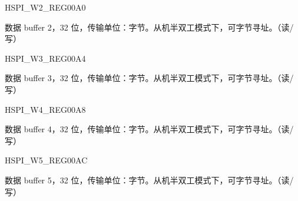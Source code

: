 \begin{register}{H}{SPI\_W2\_REG}{\hexprefix{}00A0}\label{regdesc:SPIW2REG}
%
\regnewline%
\begin{regdesc}\begin{reglist}
\label{fielddesc:SPIBUF2}\item [SPI\_BUF2] 数据 buffer 2，32 位，传输单位：字节。从机半双工模式下，可字节寻址。（读/写）
\end{reglist}\end{regdesc}
\end{register}


\begin{register}{H}{SPI\_W3\_REG}{\hexprefix{}00A4}\label{regdesc:SPIW3REG}
%
\regnewline%
\begin{regdesc}\begin{reglist}
\label{fielddesc:SPIBUF3}\item [SPI\_BUF3] 数据 buffer 3，32 位，传输单位：字节。从机半双工模式下，可字节寻址。（读/写）
\end{reglist}\end{regdesc}
\end{register}


\begin{register}{H}{SPI\_W4\_REG}{\hexprefix{}00A8}\label{regdesc:SPIW4REG}
%
\regnewline%
\begin{regdesc}\begin{reglist}
\label{fielddesc:SPIBUF4}\item [SPI\_BUF4] 数据 buffer 4，32 位，传输单位：字节。从机半双工模式下，可字节寻址。（读/写）
\end{reglist}\end{regdesc}
\end{register}


\begin{register}{H}{SPI\_W5\_REG}{\hexprefix{}00AC}\label{regdesc:SPIW5REG}
%
\regnewline%
\begin{regdesc}\begin{reglist}
\label{fielddesc:SPIBUF5}\item [SPI\_BUF5] 数据 buffer 5，32 位，传输单位：字节。从机半双工模式下，可字节寻址。（读/写）
\end{reglist}\end{regdesc}
\end{register}


